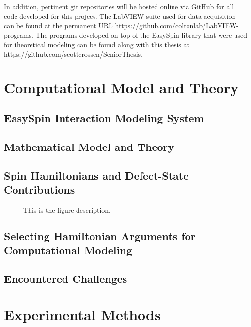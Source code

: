 \documentclass[oneside, astronomy, noacknowlegments]{BYUPhys}
\begin{document}
In addition, pertinent git repositories will be hosted online via GitHub for all code developed for this project. The LabVIEW suite used for data acquisition can be found at the permanent URL https://github.com/coltonlab/LabVIEW-programs. The programs developed on top of the EasySpin library that were used for theoretical modeling can be found along with this thesis at https://github.com/scottcrossen/SeniorThesis.










\chapter{Computational Model and Theory}

\section{EasySpin Interaction Modeling System}

\section{Mathematical Model and Theory}

\section{Spin Hamiltonians and Defect-State Contributions}

\begin{figure}
    \caption[Example of spin-hamiltonion fields]{\label{fig:HamFields}
     This is the figure description.}
 \end{figure}

\section{Selecting Hamiltonian Arguments for Computational Modeling}

\section{Encountered Challenges}










\chapter{Experimental Methods}
\end{document}
